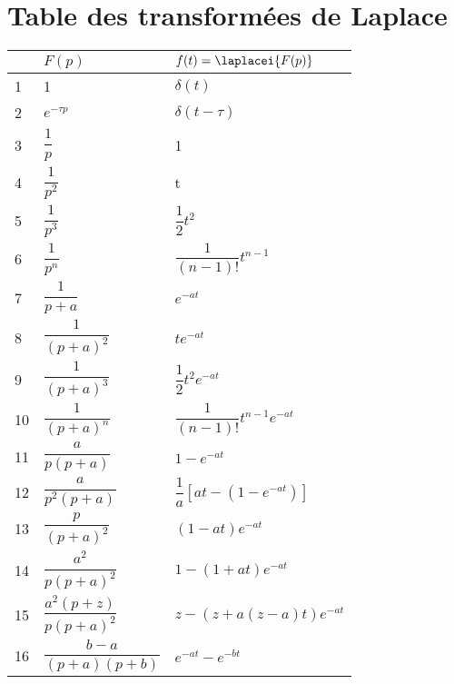 \section{Table des transformées de Laplace}
\begin{table}[H]
\centering
{}
\begin{tabular}{@{}P{0.5cm}P{3.9cm}P{8.9cm}@{}}
\toprule
    & $F(p)$ & $f(t)=\laplacei{F(p)}$ \\
 & 
    1 & 
    $\delta(t)$ \\
    2 & 
    $e^{-\tau p}$ & 
    $\delta(t-\tau)$ \\
    3 & 
    $\dfrac{1}{p}$ &
    1 \\
    4 & 
    $\dfrac{1}{p^2}$ &
    t \\
    5 & 
    $\dfrac{1}{p^3}$ & 
    $\dfrac{1}{2}t^2$ \\
    6 & 
    $\dfrac{1}{p^n}$ & 
    $\dfrac{1}{(n-1)!}t^{n-1}$ \\
    7 & 
    $\dfrac{1}{p+a}$ & 
    $e^{-at}$ \\
    8 & 
    $\dfrac{1}{(p+a)^2}$ & 
    $te^{-at}$ \\
    9 & 
    $\dfrac{1}{(p+a)^3}$ & 
    $\dfrac{1}{2}t^2e^{-at}$ \\
    10 & 
    $\dfrac{1}{(p+a)^n}$ & 
    $\dfrac{1}{(n-1)!}t^{n-1}e^{-at}$ \\
    11 & 
    $\dfrac{a}{p(p+a)}$ & 
    $1-e^{-at}$ \\
    12 & 
    $\dfrac{a}{p^2(p+a)}$ & 
    $\dfrac{1}{a}\left[at-\left(1-e^{-at}\right)\right]$\\
    13 & 
    $\dfrac{p}{(p+a)^2}$ & 
    $(1-at)e^{-at}$ \\
    14 & 
    $\dfrac{a^2}{p(p+a)^2}$ & 
    $1-(1+at)e^{-at}$ \\
    15 & 
    $\dfrac{a^2(p+z)}{p(p+a)^2}$ & 
    $z-\left(z+a(z-a)t\right)e^{-at}$ \\
    16 & 
    $\dfrac{b-a}{(p+a)(p+b)}$ & 
    $e^{-at}-e^{-bt}$ \\
\bottomrule
\end{tabular}
\end{table}
